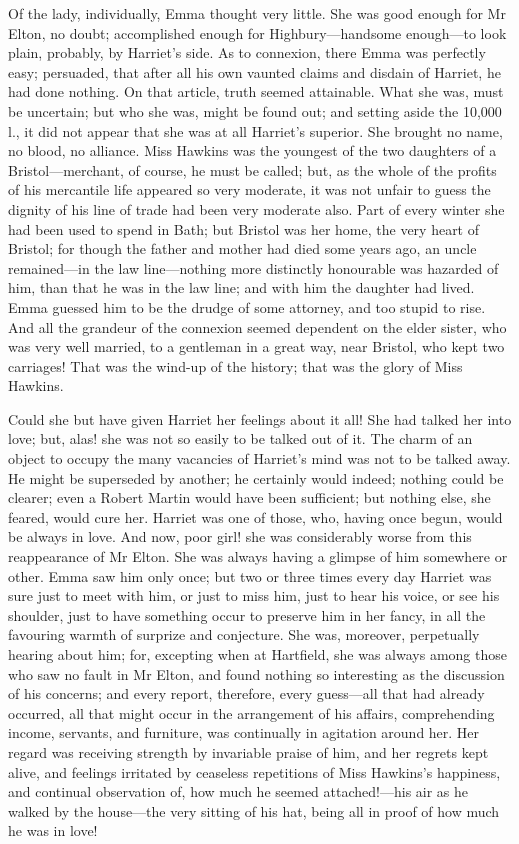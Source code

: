 Of the lady, individually, Emma thought very little. She was good enough for Mr Elton, no doubt; accomplished enough for Highbury—handsome enough—to look plain, probably, by Harriet's side. As to connexion, there Emma was perfectly easy; persuaded, that after all his own vaunted claims and disdain of Harriet, he had done nothing. On that article, truth seemed attainable. What she was, must be uncertain; but who she was, might be found out; and setting aside the 10,000 l., it did not appear that she was at all Harriet's superior. She brought no name, no blood, no alliance. Miss Hawkins was the youngest of the two daughters of a Bristol—merchant, of course, he must be called; but, as the whole of the profits of his mercantile life appeared so very moderate, it was not unfair to guess the dignity of his line of trade had been very moderate also. Part of every winter she had been used to spend in Bath; but Bristol was her home, the very heart of Bristol; for though the father and mother had died some years ago, an uncle remained—in the law line—nothing more distinctly honourable was hazarded of him, than that he was in the law line; and with him the daughter had lived. Emma guessed him to be the drudge of some attorney, and too stupid to rise. And all the grandeur of the connexion seemed dependent on the elder sister, who was very well married, to a gentleman in a great way, near Bristol, who kept two carriages! That was the wind-up of the history; that was the glory of Miss Hawkins.

Could she but have given Harriet her feelings about it all! She had talked her into love; but, alas! she was not so easily to be talked out of it. The charm of an object to occupy the many vacancies of Harriet's mind was not to be talked away. He might be superseded by another; he certainly would indeed; nothing could be clearer; even a Robert Martin would have been sufficient; but nothing else, she feared, would cure her. Harriet was one of those, who, having once begun, would be always in love. And now, poor girl! she was considerably worse from this reappearance of Mr Elton. She was always having a glimpse of him somewhere or other. Emma saw him only once; but two or three times every day Harriet was sure just to meet with him, or just to miss him, just to hear his voice, or see his shoulder, just to have something occur to preserve him in her fancy, in all the favouring warmth of surprize and conjecture. She was, moreover, perpetually hearing about him; for, excepting when at Hartfield, she was always among those who saw no fault in Mr Elton, and found nothing so interesting as the discussion of his concerns; and every report, therefore, every guess—all that had already occurred, all that might occur in the arrangement of his affairs, comprehending income, servants, and furniture, was continually in agitation around her. Her regard was receiving strength by invariable praise of him, and her regrets kept alive, and feelings irritated by ceaseless repetitions of Miss Hawkins's happiness, and continual observation of, how much he seemed attached!—his air as he walked by the house—the very sitting of his hat, being all in proof of how much he was in love!

